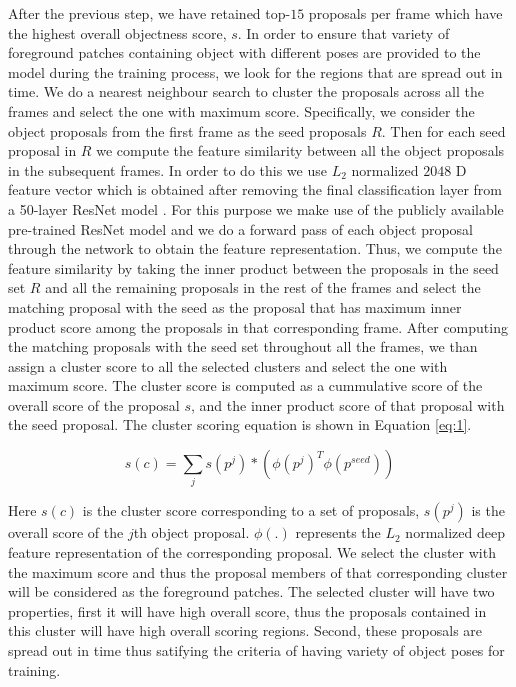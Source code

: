 \documentclass[10pt,twocolumn,letterpaper]{article}
\begin{document}
After the previous step, we have retained top-$15$ proposals per frame which have the highest overall objectness score, $s$. In order to ensure that variety of foreground patches containing object with different poses are provided to the model during the training process, we look for the regions that are spread out in time. We do a nearest neighbour search to cluster the proposals across all the frames and select the one with maximum score. Specifically, we consider the object proposals from the first frame as the seed proposals $R$. Then for each seed proposal in $R$ we compute the feature similarity between all the object proposals in the subsequent frames. In order to do this we use $L_{2}$ normalized $2048$ D feature vector which is obtained after removing the final classification layer from a 50-layer ResNet model \cite{he2016deep}. For this purpose we make use of the publicly available pre-trained ResNet model and we do a forward pass of each object proposal through the network to obtain the feature representation. Thus, we compute the feature similarity by taking the inner product between the proposals in the seed set $R$ and all the remaining proposals in the rest of the frames and select the matching proposal with the seed as the proposal that has maximum inner product score among the proposals in that corresponding frame. After computing the matching proposals with the seed set throughout all the frames, we than assign a cluster score to all the selected clusters and select the one with maximum score. The cluster score is computed as a cummulative score of the overall score of the proposal $s$, and the inner product score of that proposal with the seed proposal. The cluster scoring equation is shown in Equation \ref{eq:1}.

\begin{equation}
s(c) = \sum_{j} s(p^{j}) * (\phi(p^{j})^{T}\phi(p^{seed}))
\label{eq:1}
\end{equation}

Here $s(c)$ is the cluster score corresponding to a set of proposals, $s(p^{j})$ is the overall score of the $j$th object proposal. $\phi(.)$ represents the $L_{2}$ normalized deep feature representation of the corresponding proposal. We select the cluster with the maximum score and thus the proposal members of that corresponding cluster will be considered as the foreground patches. The selected cluster will have two properties, first it will have high overall score, thus the proposals contained in this cluster will have high overall scoring regions. Second, these proposals are spread out in time thus satifying the criteria of having variety of object poses for training. 
\end{document}
